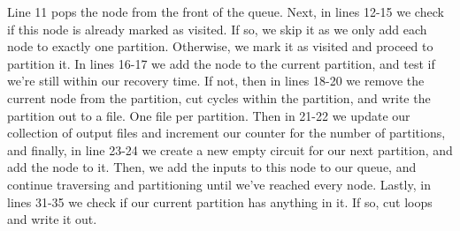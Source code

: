 \documentclass[12pt,final,oneside]{article} %
\begin{document}
Line 11 pops the node from the front of the queue.
Next, in lines 12-15 we check if this node is already marked as visited. If so, we skip it as we only add each node to exactly one partition. Otherwise, we mark it as visited and proceed to partition it.
In lines 16-17 we add the node to the current partition, and test if we're still within our recovery time.
If not, then in lines 18-20 we remove the current node from the partition, cut cycles within the partition, and write the partition out to a file. One file per partition.
Then in 21-22 we update our collection of output files and increment our counter for the number of partitions, and finally, in line 23-24 we create a new empty circuit for our next partition, and add the node to it.
Then, we add the inputs to this node to our queue, and continue traversing and partitioning until we've reached every node.
Lastly, in lines 31-35 we check if our current partition has anything in it. If so, cut loops and write it out.

\newpage
\end{document}
